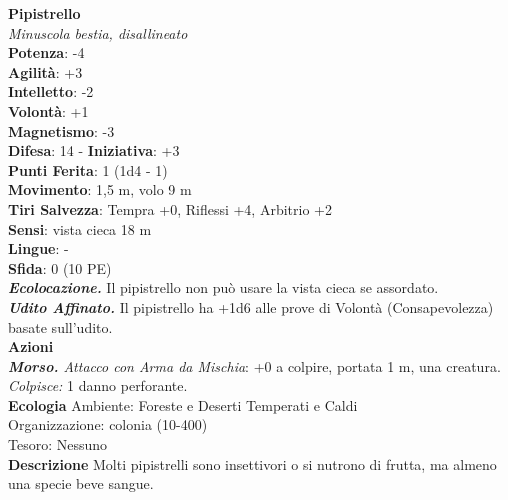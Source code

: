 \begin{multicols}{2}
\medskip\textbf{Pipistrello}\\
\emph{Minuscola bestia, disallineato}\\
\textbf{Potenza}: -4\\
\textbf{Agilità}: +3\\
\textbf{Intelletto}: -2\\
\textbf{Volontà}: +1\\
\textbf{Magnetismo}: -3\\
\textbf{Difesa}: 14 - \textbf{Iniziativa}: +3\\
\textbf{Punti Ferita}: 1 (1d4 - 1)\\
\textbf{Movimento}: 1,5 m, volo 9 m\\
\textbf{Tiri Salvezza}: Tempra +0, Riflessi +4, Arbitrio +2 \\
\textbf{Sensi}: vista cieca 18 m \\
\textbf{Lingue}: -\\
\textbf{Sfida}: 0 (10 PE)\smallskip\\
\emph{\textbf{Ecolocazione.}} Il pipistrello non può usare la vista cieca se assordato.\\
\emph{\textbf{Udito Affinato.}} Il pipistrello ha +1d6 alle prove di Volontà (Consapevolezza) basate sull'udito.\\
\smallskip\textbf{Azioni}\\
\emph{\textbf{Morso.} Attacco con Arma da Mischia}: +0 a colpire, portata 1 m, una creatura.\\
\emph{Colpisce:} 1 danno perforante.\\
\textbf{Ecologia}
Ambiente: Foreste e Deserti Temperati e Caldi\\
Organizzazione: colonia (10-400)\\
Tesoro: Nessuno\\
\textbf{Descrizione}
Molti pipistrelli sono insettivori o si nutrono di frutta, ma almeno una specie beve sangue.\\



\end{multicols}
